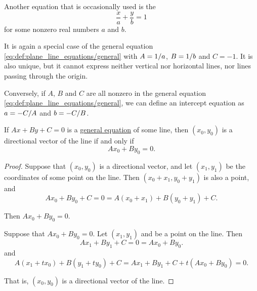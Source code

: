 \begin{definition}
\begin{thmenum}
     Another equation that is occasionally used is the 
    \begin{equation}\label{eq:def:plane_line_equations/intercept}
      \frac x a + \frac y b = 1
    \end{equation}
    for some nonzero real numbers \( a \) and \( b \).

    It is again a special case of the general equation \eqref{eq:def:plane_line_equations/general} with \( A = \ifrac 1 a \), \( B = \ifrac 1 b \) and \( C = -1 \). It is also unique, but it cannot express neither vertical nor horizontal lines, nor lines passing through the origin.

    Conversely, if \( A \), \( B \) and \( C \) are all nonzero in the general equation \eqref{eq:def:plane_line_equations/general}, we can define an intercept equation as \( a = -\ifrac C A \) and \( b = -\ifrac C B \).
  \end{thmenum}
\end{definition}

\begin{proposition}\label{thm:coordinates_of_directional_vector}
  If \( A x + B y + C = 0 \) is a \hyperref[def:plane_line_equations/general]{general equation} of some line, then \( (x_0, y_0) \) is a directional vector of the line if and only if
  \begin{equation*}
    A x_0 + B y_0 = 0.
  \end{equation*}
\end{proposition}
\begin{proof}
  \SufficiencySubProof Suppose that \( (x_0, y_0) \) is a directional vector, and let \( (x_1, y_1) \) be the coordinates of some point on the line. Then \( (x_0 + x_1, y_0 + y_1) \) is also a point, and
  \begin{equation*}
    A x_0 + B y_0 + C = 0 = A (x_0 + x_1) + B (y_0 + y_1) + C.
  \end{equation*}

  Then \( A x_0 + B y_0 = 0 \).

  \NecessitySubProof Suppose that \( A x_0 + B y_0 = 0 \). Let \( (x_1, y_1) \) and be a point on the line. Then
  \begin{equation*}
    A x_1 + B y_1 + C = 0 = A x_0 + B y_0.
  \end{equation*}
  and
  \begin{equation*}
    A (x_1 + t x_0) + B (y_1 + t y_0) + C = A x_1 + B y_1 + C + t (A x_0 + B y_0) = 0.
  \end{equation*}

  That is, \( (x_0, y_0) \) is a directional vector of the line.
\end{proof}

